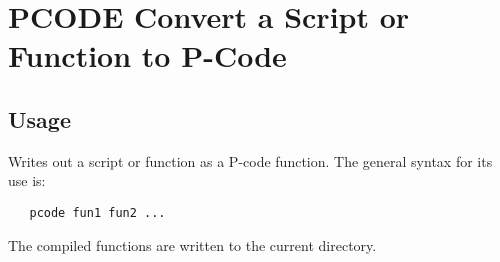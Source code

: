 \section{PCODE Convert a Script or Function to P-Code}

\subsection{Usage}

Writes out a script or function as a P-code function.
The general syntax for its use is:
\begin{verbatim}
   pcode fun1 fun2 ...
\end{verbatim}
The compiled functions are written to the current
directory.
